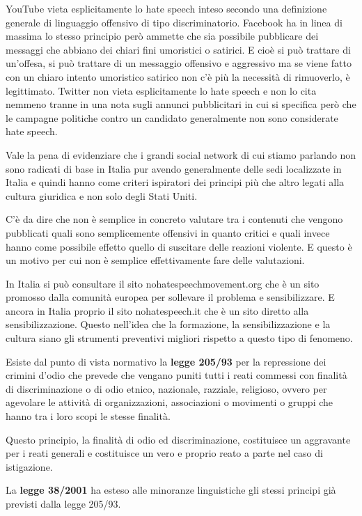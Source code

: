 YouTube vieta esplicitamente lo hate speech inteso secondo una definizione generale di linguaggio offensivo di tipo discriminatorio. Facebook ha in linea di massima lo stesso principio però ammette che sia possibile pubblicare dei messaggi che abbiano dei chiari fini umoristici o satirici. E cioè si può trattare di un'offesa, si può trattare di un messaggio offensivo e aggressivo ma se viene fatto con un chiaro intento umoristico satirico non c'è più la necessità di rimuoverlo, è legittimato. Twitter non vieta esplicitamente lo hate speech e non lo cita nemmeno tranne in una nota sugli annunci pubblicitari in cui si specifica però che le campagne politiche contro un candidato generalmente non sono considerate hate speech.

Vale la pena di evidenziare che i grandi social network di cui stiamo parlando non sono radicati di base in Italia pur avendo generalmente delle sedi localizzate in Italia e quindi hanno come criteri ispiratori dei principi più che altro legati alla cultura giuridica e non solo degli Stati Uniti.

C'è da dire che non è semplice in concreto valutare tra i contenuti che vengono pubblicati quali sono semplicemente offensivi in quanto critici e quali invece hanno come possibile effetto quello di suscitare delle reazioni violente. E questo è un motivo per cui non è semplice effettivamente fare delle valutazioni.

In Italia si può consultare il sito nohatespeechmovement.org che è un sito promosso dalla comunità europea per sollevare il problema e sensibilizzare. E ancora in Italia proprio il sito nohatespeech.it che è un sito diretto alla sensibilizzazione. Questo nell'idea che la formazione, la sensibilizzazione e la cultura siano gli strumenti preventivi migliori rispetto a questo tipo di fenomeno.

Esiste dal punto di vista normativo la \textbf{legge 205/93} per la repressione dei crimini d'odio che prevede che vengano puniti tutti i reati commessi con finalità di discriminazione o di odio etnico, nazionale, razziale, religioso, ovvero per agevolare le attività di organizzazioni, associazioni o movimenti o gruppi che hanno tra i loro scopi le stesse finalità.

Questo principio, la finalità di odio ed discriminazione, costituisce un aggravante per i reati generali e costituisce un vero e proprio reato a parte nel caso di istigazione.

La \textbf{legge 38/2001} ha esteso alle minoranze linguistiche gli stessi principi già previsti dalla legge 205/93.

